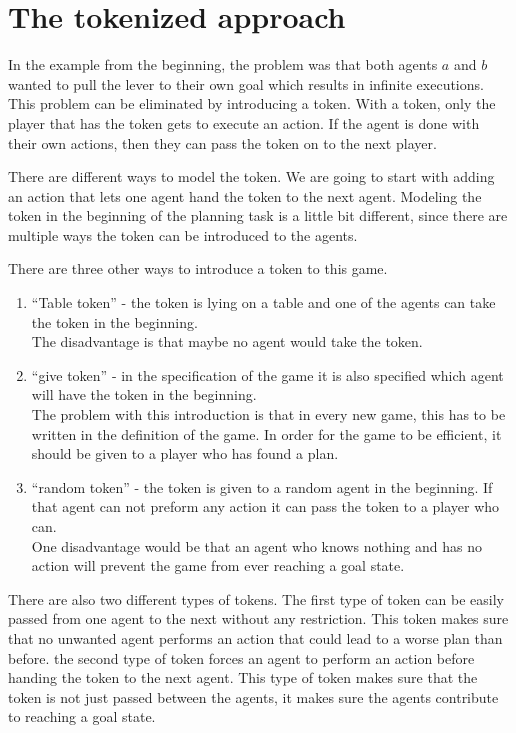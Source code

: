 \chapter{The tokenized approach}\label{chap:approach}

In the example from the beginning, the problem was that both agents $a$ and $b$ wanted to pull the lever to their own goal which results in infinite executions. This problem can be eliminated by introducing a token. With a token, only the player that has the token gets to execute an action. If the agent is done with their own actions, then they can pass the token on to the next player.

There are different ways to model the token. We are going to start with adding an action that lets one agent hand the token to the next agent. Modeling the token in the beginning of the planning task is a little bit different, since there are multiple ways the token can be introduced to the agents.

There are three other ways to introduce a token to this game. 
\begin{enumerate}
  \item ``Table token'' - the token is lying on a table and one of the agents can take the token in the beginning. \\
  The disadvantage is that maybe no agent would take the token.
  \item ``give token'' - in the specification of the game it is also specified which agent will have the token in the beginning. \\
  The problem with this introduction is that in every new game, this has to be written in the definition of the game. In order for the game to be efficient, it should be given to a player who has found a plan.
  \item ``random token'' - the token is given to a random agent in the beginning. If that agent can not preform any action it can pass the token to a player who can. \\
  One disadvantage would be that an agent who knows nothing and has no action will prevent the game from ever reaching a goal state.
\end{enumerate}

There are also two different types of tokens. The first type of token can be easily passed from one agent to the next without any restriction. This token makes sure that no unwanted agent performs an action that could lead to a worse plan than before. the second type of token forces an agent to perform an action before handing the token to the next agent. This type of token makes sure that the token is not just passed between the agents, it makes sure the agents contribute to reaching a goal state.

